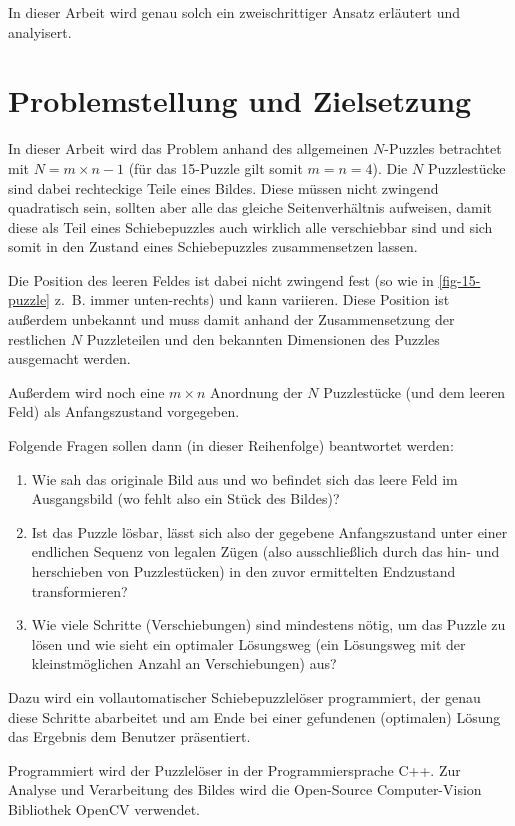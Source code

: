 \documentclass{whswinvcbook}
\begin{document}
In dieser Arbeit wird genau solch ein zweischrittiger Ansatz erläutert und analyisert.
\section{Problemstellung und Zielsetzung}
In dieser Arbeit wird das Problem anhand des allgemeinen $N$-Puzzles betrachtet mit $N=m\times n-1$ (für das 15-Puzzle gilt somit $m=n=4$).
Die $N$ Puzzlestücke sind dabei rechteckige Teile eines Bildes. Diese müssen nicht zwingend quadratisch sein, sollten aber alle das gleiche Seitenverhältnis aufweisen, damit diese als Teil eines Schiebepuzzles auch wirklich alle verschiebbar sind und sich somit in den Zustand eines Schiebepuzzles zusammensetzen lassen.

Die Position des leeren Feldes ist dabei nicht zwingend fest (so wie in \ref{fig-15-puzzle} z.~B. immer unten-rechts) und kann variieren. Diese Position ist außerdem unbekannt und muss damit anhand der Zusammensetzung der restlichen $N$ Puzzleteilen und den bekannten Dimensionen des Puzzles ausgemacht werden.

Außerdem wird noch eine $m\times n$ Anordnung der $N$ Puzzlestücke (und dem leeren Feld) als Anfangszustand vorgegeben.

Folgende Fragen sollen dann (in dieser Reihenfolge) beantwortet werden:
\begin{enumerate}
    \item Wie sah das originale Bild aus und wo befindet sich das leere Feld im Ausgangsbild (wo fehlt also ein Stück des Bildes)?
    \item Ist das Puzzle lösbar, lässt sich also der gegebene Anfangszustand unter einer endlichen Sequenz von legalen Zügen (also ausschließlich durch das hin- und herschieben von Puzzlestücken) in den zuvor ermittelten Endzustand transformieren?
    \item Wie viele Schritte (Verschiebungen) sind mindestens nötig, um das Puzzle zu lösen und wie sieht ein optimaler Lösungsweg (ein Lösungsweg mit der kleinstmöglichen Anzahl an Verschiebungen) aus?
\end{enumerate}
Dazu wird ein vollautomatischer Schiebepuzzlelöser programmiert, der genau diese Schritte abarbeitet und am Ende bei einer gefundenen (optimalen) Lösung das Ergebnis dem Benutzer präsentiert.

Programmiert wird der Puzzlelöser in der Programmiersprache C++. Zur Analyse und Verarbeitung des Bildes wird die Open-Source Computer-Vision Bibliothek OpenCV verwendet.
\end{document}
